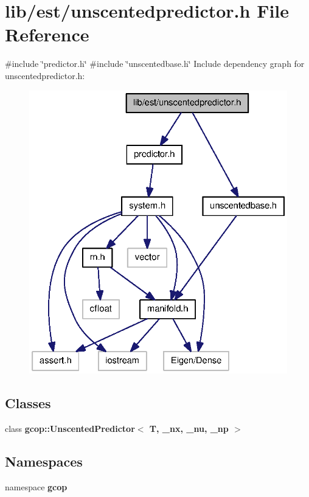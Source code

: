 \section{lib/est/unscentedpredictor.h \-File \-Reference}
\label{unscentedpredictor_8h}
{\ttfamily \#include \char`\"{}predictor.\-h\char`\"{}}\*
{\ttfamily \#include \char`\"{}unscentedbase.\-h\char`\"{}}\*
\-Include dependency graph for unscentedpredictor.\-h\-:\nopagebreak
\begin{figure}[H]
\begin{center}
\leavevmode
\includegraphics[width=326pt]{unscentedpredictor_8h__incl}
\end{center}
\end{figure}
\subsection*{\-Classes}
\begin{DoxyCompactItemize}
\item 
class {\bf gcop\-::\-Unscented\-Predictor$<$ T, \-\_\-nx, \-\_\-nu, \-\_\-np $>$}
\end{DoxyCompactItemize}
\subsection*{\-Namespaces}
\begin{DoxyCompactItemize}
\item 
namespace {\bf gcop}
\end{DoxyCompactItemize}

